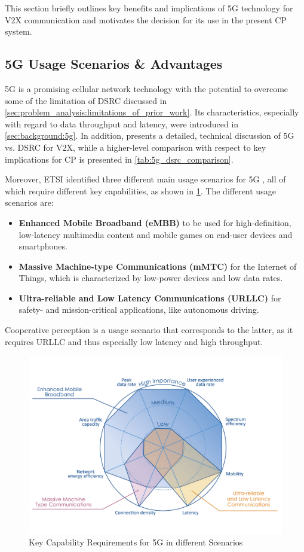 This section briefly outlines key benefits and implications of 5G technology for V2X communication and motivates the decision for its use in the present CP system.

\subsection{5G Usage Scenarios \& Advantages}
\label{subsec:concept_design:5g_usage_scenarios_advantages}
5G is a promising cellular network technology with the potential to overcome some of the limitation of DSRC discussed in \cref{sec:problem_analysis:limitations_of_prior_work}. Its characteristics, especially with regard to data throughput and latency, were introduced in \cref{sec:background:5g}. In addition, \cite{5GAutomotiveAssociation2016} presents a detailed, technical discussion of 5G vs. DSRC for V2X, while a higher-level comparison with respect to key implications for CP is presented in \cref{tab:5g_dsrc_comparison}.
\par
\bigskip

Moreover, ETSI identified three different main usage scenarios for 5G \cite{ETSI5G}, all of which require different key capabilities, as shown in \cref{fig:5g_capabilities}. The different usage scenarios are:

\begin{itemize}
	\item \textbf{Enhanced Mobile Broadband (eMBB)} to be used for high-definition, low-latency multimedia content and mobile games on end-user devices and smartphones.
	\item \textbf{Massive Machine-type Communications (mMTC)} for the Internet of Things, which is characterized by low-power devices and low data rates.
	\item \textbf{Ultra-reliable and Low Latency Communications (URLLC)} for safety- and mission-critical applications, like autonomous driving. 
\end{itemize}

Cooperative perception is a usage scenario that corresponds to the latter, as it requires URLLC and thus especially low latency and high throughput.

\begin{figure}[h]
	\centering
	\includegraphics[width=0.75\linewidth]{98_images/5g_spider_chart}
	\caption[Key Capability Requirements for 5G]{Key Capability Requirements for 5G in different Scenarios \cite{ETSI5G}}
	\label{fig:5g_capabilities}
\end{figure}


